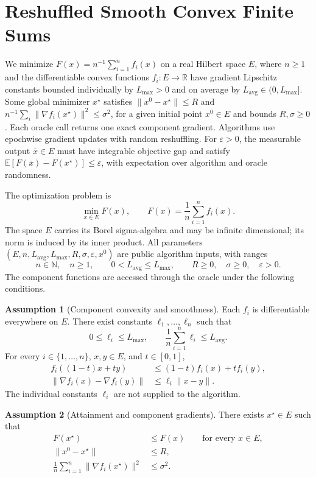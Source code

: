 \documentclass[10pt]{article}
\theoremstyle{definition}
\newtheorem{assumption}{Assumption}
\begin{document}
\section*{Reshuffled Smooth Convex Finite Sums}
We minimize $F(x)=n^{-1}\sum_{i=1}^n f_i(x)$ on a real Hilbert space $E$, where $n\geq1$ and the differentiable convex functions $f_i:E\to\mathbb{R}$ have gradient Lipschitz constants bounded individually by $L_{\max}>0$ and on average by $L_{\mathrm{avg}}\in(0,L_{\max}]$. Some global minimizer $x^\star$ satisfies $\|x^0-x^\star\|\leq R$ and $n^{-1}\sum_i\|\nabla f_i(x^\star)\|^2\leq\sigma^2$, for a given initial point $x^0\in E$ and bounds $R,\sigma\geq0$. Each oracle call returns one exact component gradient. Algorithms use epochwise gradient updates with random reshuffling. For $\varepsilon>0$, the measurable output $\bar{x}\in E$ must have integrable objective gap and satisfy $\mathbb{E}[F(\bar{x})-F(x^\star)]\leq\varepsilon$, with expectation over algorithm and oracle randomness.

The optimization problem is
\[
\min_{x\in E} F(x),
\qquad F(x)=\frac{1}{n}\sum_{i=1}^n f_i(x).
\]
The space $E$ carries its Borel sigma-algebra and may be infinite dimensional; its norm is induced by its inner product. All parameters $(E,n,L_{\mathrm{avg}},L_{\max},R,\sigma,\varepsilon,x^0)$ are public algorithm inputs, with ranges
\[
n\in\mathbb{N},\quad n\geq1,\qquad
0<L_{\mathrm{avg}}\leq L_{\max},\qquad
R\geq0,\quad \sigma\geq0,\quad \varepsilon>0.
\]
The component functions are accessed through the oracle under the following conditions.

\begin{assumption}[Component convexity and smoothness]
Each $f_i$ is differentiable everywhere on $E$. There exist constants $\ell_1,\ldots,\ell_n$ such that
\[
0\leq\ell_i\leq L_{\max},\qquad
\frac{1}{n}\sum_{i=1}^n\ell_i\leq L_{\mathrm{avg}}.
\]
For every $i\in\{1,\ldots,n\}$, $x,y\in E$, and $t\in[0,1]$,
\begin{align*}
f_i((1-t)x+ty)&\leq(1-t)f_i(x)+tf_i(y),\\
\|\nabla f_i(x)-\nabla f_i(y)\|&\leq\ell_i\|x-y\|.
\end{align*}
The individual constants $\ell_i$ are not supplied to the algorithm.
\end{assumption}

\begin{assumption}[Attainment and component gradients]
There exists $x^\star\in E$ such that
\begin{align*}
F(x^\star)&\leq F(x)\qquad\text{for every }x\in E,\\
\|x^0-x^\star\|&\leq R,\\
\frac{1}{n}\sum_{i=1}^n\|\nabla f_i(x^\star)\|^2&\leq\sigma^2.
\end{align*}
\end{assumption}
\end{document}
